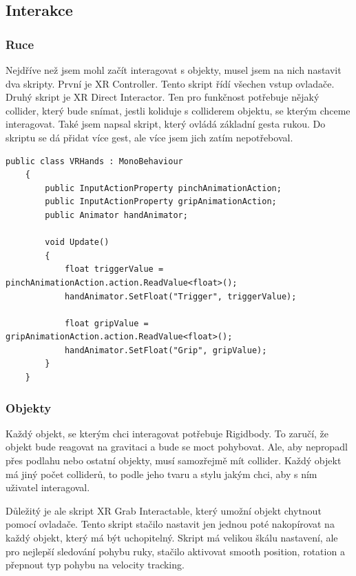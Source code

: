\documentclass[12pt, a4paper,
twoside,        %
openright
]{report}
\begin{document}
\subsection{Interakce}
\subsubsection{Ruce}
Nejdříve než jsem mohl začít interagovat s objekty, musel jsem na nich nastavit dva skripty. První je XR Controller. Tento skript řídí všechen vstup ovladače. Druhý skript je XR Direct Interactor. Ten pro funkčnost potřebuje nějaký collider, který bude snímat, jestli koliduje s colliderem objektu, se kterým chceme interagovat. Také jsem napsal skript, který ovládá základní gesta rukou. Do skriptu se dá přidat více gest, ale více jsem jich zatím nepotřeboval.

\begin{lstlisting}[style=csh, caption={Ukázka kódu na gesta rukou.}]	
	public class VRHands : MonoBehaviour
	{
		public InputActionProperty pinchAnimationAction;
		public InputActionProperty gripAnimationAction;
		public Animator handAnimator;
		
		void Update()
		{
			float triggerValue = pinchAnimationAction.action.ReadValue<float>();
			handAnimator.SetFloat("Trigger", triggerValue);
			
			float gripValue = gripAnimationAction.action.ReadValue<float>();
			handAnimator.SetFloat("Grip", gripValue);
		}
	}
\end{lstlisting}

\subsubsection{Objekty}
Každý objekt, se kterým chci interagovat potřebuje Rigidbody. To zaručí, že objekt bude reagovat na gravitaci a bude se moct pohybovat. Ale, aby nepropadl přes podlahu nebo ostatní objekty, musí samozřejmě mít collider. Každý objekt má jiný počet colliderů, to podle jeho tvaru a stylu jakým chci, aby s ním uživatel interagoval.

Důležitý je ale skript XR Grab Interactable, který umožní objekt chytnout pomocí ovladače. Tento skript stačilo nastavit jen jednou poté nakopírovat na každý objekt, který má být uchopitelný. Skript má velikou škálu nastavení, ale pro nejlepší sledování pohybu ruky, stačilo aktivovat smooth position, rotation a přepnout typ pohybu na velocity tracking.
\end{document}
